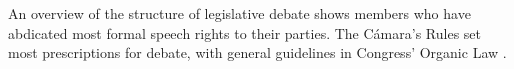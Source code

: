 \documentclass[letter,12pt]{article}
\begin{document}



An overview of the structure of legislative debate shows members who have abdicated most formal speech rights to their parties. The Cámara's Rules \citep{reglamentoDipMx.2019} set most prescriptions for debate, with general guidelines in Congress' Organic Law \citep{loceum.2019}.
\end{document}
